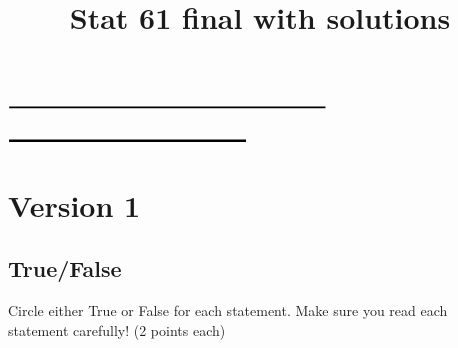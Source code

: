 \documentclass[12pt]{article}
\title{Stat 61 final with solutions}
\date{}
\begin{document}
\maketitle
\vspace{-2cm}
 $\rule{8cm}{0.5mm}$
\vspace{1cm}

 $\rule{6cm}{0.5mm}$
\vspace{-0.5cm}

\section*{Version 1}
\subsection{True/False}
Circle either True or False for each statement. Make sure you read each statement carefully! (2 points each)
\end{document}
